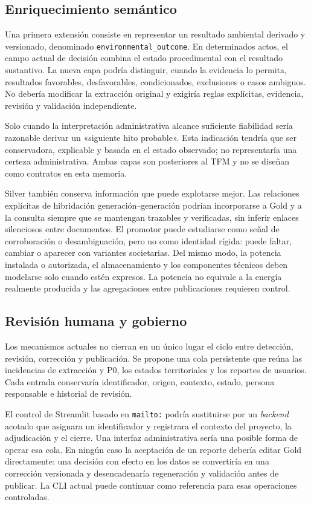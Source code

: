\subsection{Enriquecimiento semántico}

Una primera extensión consiste en representar un resultado ambiental derivado
y versionado, denominado \texttt{environmental\_outcome}. En determinados actos,
el campo actual de decisión combina el estado procedimental con el resultado
sustantivo. La nueva capa podría distinguir, cuando la evidencia lo permita,
resultados favorables, desfavorables, condicionados, exclusiones o casos
ambiguos. No debería modificar la extracción original y exigiría reglas
explícitas, evidencia, revisión y validación independiente.

Solo cuando la interpretación administrativa alcance suficiente fiabilidad
sería razonable derivar un «siguiente hito probable». Esta indicación tendría
que ser conservadora, explicable y basada en el estado observado; no
representaría una certeza administrativa. Ambas capas son posteriores al TFM
y no se diseñan como contratos en esta memoria.

Silver también conserva información que puede explotarse mejor. Las relaciones
explícitas de hibridación generación--generación podrían incorporarse a Gold y
a la consulta siempre que se mantengan trazables y verificadas, sin inferir
enlaces silenciosos entre documentos. El promotor puede estudiarse como señal
de corroboración o desambiguación, pero no como identidad rígida: puede faltar,
cambiar o aparecer con variantes societarias. Del mismo modo, la potencia
instalada o autorizada, el almacenamiento y los componentes técnicos deben
modelarse solo cuando estén expresos. La potencia no equivale a la energía
realmente producida y las agregaciones entre publicaciones requieren control.

\subsection{Revisión humana y gobierno}
\label{sec:cola-unificada-futura}

Los mecanismos actuales no cierran en un único lugar el ciclo entre detección,
revisión, corrección y publicación. Se propone una cola persistente que reúna
las incidencias de extracción y P0, los estados territoriales y los reportes de
usuarios. Cada entrada conservaría identificador, origen, contexto, estado,
persona responsable e historial de revisión.

El control de Streamlit basado en \texttt{mailto:} podría sustituirse por un
\emph{backend} acotado que asignara un identificador y registrara el contexto del
proyecto, la adjudicación y el cierre. Una interfaz administrativa sería una
posible forma de operar esa cola. En ningún caso la aceptación de un reporte
debería editar Gold directamente: una decisión con efecto en los datos se
convertiría en una corrección versionada y desencadenaría regeneración y
validación antes de publicar. La CLI actual puede continuar como referencia
para esas operaciones controladas.

